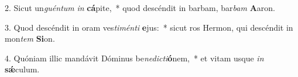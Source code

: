 2. Sicut un\textit{guén}\textit{tum} \textit{in} \textbf{cá}pite,~*  quod descéndit in barbam, bar\textit{bam} \textbf{A}aron.\

3. Quod descéndit in oram ves\textit{ti}\textit{mén}\textit{ti} \textbf{e}jus:~*  sicut ros Hermon, qui descéndit in mon\textit{tem} \textbf{Si}on.\

4. Quóniam illic mandávit Dóminus be\textit{ne}\textit{dic}\textit{ti}\textbf{ó}nem,~*  et vitam usque \textit{in} \textbf{sǽ}culum.\

